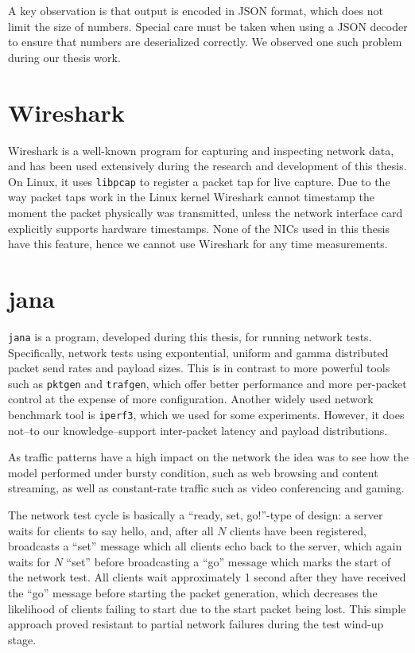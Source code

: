 A key observation is that output is encoded in JSON format, which does not limit
the size of numbers. Special care must be taken when using a JSON decoder to
ensure that numbers are deserialized correctly. We observed one such problem
during our thesis work.

\section{Wireshark}

Wireshark is a well-known program for capturing and inspecting network data,
and has been used extensively during the research and development of this
thesis. On Linux, it uses \texttt{libpcap} to register a packet tap for live
capture. Due to the way packet taps work in the Linux kernel Wireshark cannot
timestamp the moment the packet physically was transmitted, unless the network
interface card explicitly supports hardware timestamps. None of the NICs used
in this thesis have this feature, hence we cannot use Wireshark for any
time measurements.

\section{jana}

\texttt{jana} is a program, developed during this thesis, for running network
 tests. Specifically, network tests using expontential, uniform and gamma
 distributed packet send rates and payload sizes. This is in contrast to more
 powerful tools such as \texttt{pktgen} and \texttt{trafgen}, which offer
 better performance and more per-packet control at the expense of more
 configuration. Another widely used network benchmark tool is \texttt
 {iperf3}, which we used for some experiments. However, it does not--to our
 knowledge--support inter-packet latency and payload distributions.

As traffic patterns have a high impact on the network the idea was to see how
the model performed under bursty condition, such as web browsing and content
streaming, as well as constant-rate traffic such as video conferencing and
gaming.

The network test cycle is basically a ``ready, set, go!''-type of design: a
server waits for clients to say hello, and, after all $N$ clients have been
registered, broadcasts a ``set'' message which all clients echo back to the
server, which again waits for $N$ ``set'' before broadcasting a ``go''
message which marks the start of the network test. All clients wait
approximately 1 second after they have received the ``go'' message before
starting the packet generation, which decreases the likelihood of clients
failing to start due to the start packet being lost. This simple approach
proved resistant to partial network failures during the test wind-up stage.


